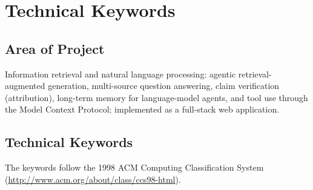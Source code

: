 \documentclass[oneside,a4paper,12pt]{report}
\begin{document}
\chapter{Technical Keywords}
\section{Area of Project}
Information retrieval and natural language processing: agentic retrieval-augmented generation, multi-source question answering, claim verification (attribution), long-term memory for language-model agents, and tool use through the Model Context Protocol; implemented as a full-stack web application.

\section{Technical Keywords}
The keywords follow the 1998 ACM Computing Classification System (\url{http://www.acm.org/about/class/ccs98-html}).
\end{document}
